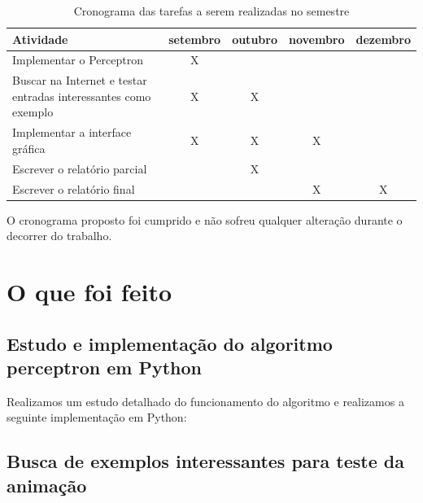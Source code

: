 \documentclass[brazil, a4paper]{article}
\begin{document}
\begin{table}[h]
    \begin{tabular}{|p{5cm}|c|c|c|c|}
    \hline
    Atividade                                                       & setembro & outubro & novembro & dezembro \\ \hline
    Implementar o Perceptron                                        & X        & ~       & ~        & ~        \\
    Buscar na Internet e testar entradas interessantes como exemplo & X        & X       & ~        & ~        \\
    Implementar a interface gráfica                                 & X        & X       & X        & ~        \\
    Escrever o relatório parcial                                    & ~        & X       & ~        & ~        \\ 
    Escrever o relatório final                                      & ~        & ~       & X        & X        \\ \hline
    \end{tabular}
    \caption{Cronograma das tarefas a serem realizadas no semestre}
\end{table}

O cronograma proposto foi cumprido e não sofreu qualquer alteração durante o
decorrer do trabalho.

\section{O que foi feito}


\subsection{Estudo e implementação do algoritmo perceptron em Python}

Realizamos um estudo detalhado do funcionamento do algoritmo  e realizamos a
seguinte implementação em Python:




\subsection{Busca de exemplos interessantes para teste da animação}
\end{document}

